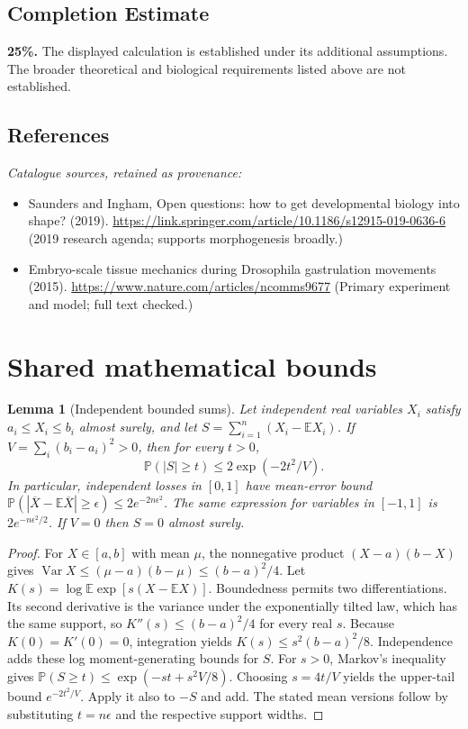 \documentclass[11pt]{article}
\newcommand{\E}{\mathbb E}
\newcommand{\Prob}{\mathbb P}
\DeclareMathOperator{\Var}{Var}
\providecommand{\E}{\mathbb E}
\providecommand{\Prob}{\mathbb P}
\providecommand{\Var}{\operatorname{Var}}
\newtheorem{sharedlemma}{Lemma}[section]
\begin{document}
\subsection{Completion Estimate}
\textbf{25\%.} The displayed calculation is established under its additional assumptions. The broader theoretical and biological requirements listed above are not established.
\subsection{References}
\noindent\emph{Catalogue sources, retained as provenance:}
\begin{itemize}
\item Saunders and Ingham, Open questions: how to get developmental biology into shape? (2019). \url{https://link.springer.com/article/10.1186/s12915-019-0636-6} (2019 research agenda; supports morphogenesis broadly.)
\item Embryo-scale tissue mechanics during Drosophila gastrulation movements (2015). \url{https://www.nature.com/articles/ncomms9677} (Primary experiment and model; full text checked.)
\end{itemize}
\clearpage


\appendix
\section{Shared mathematical bounds}\label{app:bounds}
\begin{sharedlemma}[Independent bounded sums]\label{lem:bounded}
Let independent real variables $X_i$ satisfy $a_i\leq X_i\leq b_i$ almost surely,
and let $S=\sum_{i=1}^n(X_i-\E X_i)$. If
$V=\sum_i(b_i-a_i)^2>0$, then for every $t>0$,
\[
 \Prob(|S|\geq t)\leq 2\exp(-2t^2/V).
\]
In particular, independent losses in $[0,1]$ have mean-error bound
$\Prob(|\overline X-\E\overline X|\geq\epsilon)
\leq2e^{-2n\epsilon^2}$. The same expression for variables in $[-1,1]$
is $2e^{-n\epsilon^2/2}$. If $V=0$ then $S=0$ almost surely.
\end{sharedlemma}
\begin{proof}
For $X\in[a,b]$ with mean $\mu$, the nonnegative product
$(X-a)(b-X)$ gives
$\Var X\leq(\mu-a)(b-\mu)\leq(b-a)^2/4$.
Let $K(s)=\log\E\exp[s(X-\E X)]$.
Boundedness permits two differentiations. Its second derivative is the variance
under the exponentially tilted law, which has the same support, so
$K''(s)\leq(b-a)^2/4$ for every real $s$.
Because $K(0)=K'(0)=0$, integration yields
$K(s)\leq s^2(b-a)^2/8$.
Independence adds these log moment-generating bounds for $S$.
For $s>0$, Markov's inequality gives
$\Prob(S\geq t)\leq\exp(-st+s^2V/8)$.
Choosing $s=4t/V$ yields the upper-tail bound $e^{-2t^2/V}$.
Apply it also to $-S$ and add. The stated mean versions follow by substituting
$t=n\epsilon$ and the respective support widths.
\end{proof}
\end{document}

